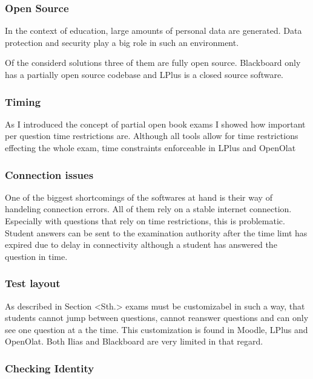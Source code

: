\hypertarget{open-source}{%
\subsubsection{Open Source}\label{open-source}}

In the context of education, large amounts of personal data are
generated. Data protection and security play a big role in such an
environment.

Of the considerd solutions three of them are fully open source.
Blackboard only has a partially open source codebase and LPlus is a
closed source software.

\hypertarget{timing}{%
\subsubsection{Timing}\label{timing}}

As I introduced the concept of partial open book exams I showed how
important per question time restrictions are. Although all tools allow
for time restrictions effecting the whole exam, time constraints
enforceable in LPlus and OpenOlat

\hypertarget{connection-issues}{%
\subsubsection{Connection issues}\label{connection-issues}}

One of the biggest shortcomings of the softwares at hand is their way of
handeling connection errors. All of them rely on a stable internet
connection. Especially with questions that rely on time restrictions,
this is problematic. Student answers can be sent to the examination
authority after the time limt has expired due to delay in connectivity
although a student has answered the question in time.

\hypertarget{test-layout}{%
\subsubsection{Test layout}\label{test-layout}}

As described in Section \textless{}Sth.\textgreater{} exams must be
customizabel in such a way, that students cannot jump between questions,
cannot reanswer questions and can only see one question at a the time.
This customization is found in Moodle, LPlus and OpenOlat. Both Ilias
and Blackboard are very limited in that regard.

\hypertarget{checking-identity}{%
\subsubsection{Checking Identity}\label{checking-identity}}

